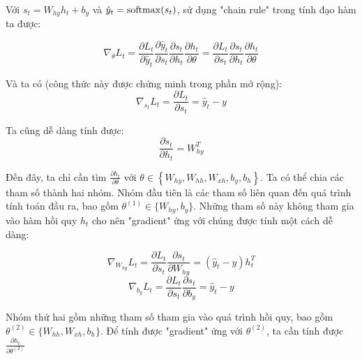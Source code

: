 Với $s_t = W_{hy} h_t + b_y$ và $\hat{y}_t = \mathrm{softmax}(s_t)$, sử dụng "chain rule" trong tính đạo hàm ta được:
	
\begin{equation} \label{gradientCalculating1}
	\nabla_{\theta} L_t = \frac{\partial L_t}{\partial \hat{y}_t} \frac{\partial \hat{y}_t}{\partial s_t} \frac{\partial s_t}{\partial h_t} \frac{\partial h_t}{\partial \theta}  = \frac{\partial L_t}{\partial s_t} \frac{\partial s_t}{\partial h_t} \frac{\partial h_t}{\partial \theta}
\end{equation}

Và ta có (công thức này được chứng minh trong phần mở rộng):
\begin{equation} \label{gradientCalculating2}
	\nabla_{s_t}L_t = \frac{\partial L_t}{\partial s_t} = \hat{y}_t - y
\end{equation}

Ta cũng dễ dàng tính được:
\begin{equation} \label{gradientCalculating3}
	\frac{\partial s_t}{\partial h_t} = W_{hy}^T
\end{equation}

Đến đây, ta chỉ cần tìm $\frac{\partial h_t}{\partial \theta}$ với $\theta \in \left\{W_{hy},W_{hh},W_{xh},b_y,b_h \right \}$. Ta có thể chia các tham số thành hai nhóm. Nhóm đầu tiên là các tham số liên quan đến quá trình tính toán đầu ra, bao gồm $\theta^{(1)} \in \{W_{hy}, b_y\}$. Những tham số này không tham gia vào hàm hồi quy $h_t$ cho nên "gradient" ứng với chúng được tính một cách dễ dàng:

\begin{equation} \label{gradientCalculating4}
	\nabla_{W_{hy}}L_t = \frac{\partial L_t}{\partial s_t} \frac{\partial s_t}{\partial W_{hy}}  =  (\hat{y}_t - y) h_t^T
\end{equation}
\begin{equation} \label{gradientCalculating5}
	\nabla_{b_{y}}L_t = \frac{\partial L_t}{\partial s_t} \frac{\partial s_t}{\partial b_{y}}  =  \hat{y}_t - y
\end{equation}

Nhóm thứ hai gồm những tham số tham gia vào quá trình hồi quy, bao gồm $\theta^{(2)} \in \{W_{hh},W_{xh},b_h \}$. Để tính được "gradient" ứng với $\theta^{(2)}$, ta cần tính được $\frac{\partial h_t}{\partial \theta^{(2)} }$

